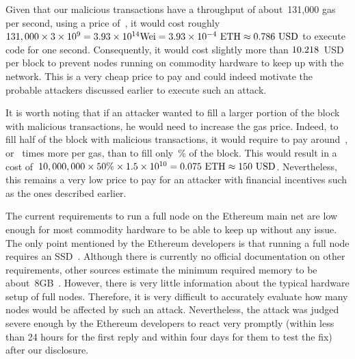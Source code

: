 Given that our malicious transactions have a throughput of about~131,000 gas per second, using a price of~, it would cost roughly~$131,000 \times 3\times 10^9 = 3.93\times 10^{14} \text{Wei} = 3.93\times 10^{-4}~\text{ETH} \approx \fpeval{round(\ToUSD{0.000393}, 4)}~\text{USD}$ to execute code for one second. Consequently, it would cost slightly more than $\fpeval{round(\ToUSD{0.000393 * 13}, 3)}$~USD per block to prevent nodes running on commodity hardware to keep up with the network. This is a very cheap price to pay and could indeed motivate the probable attackers discussed earlier to execute such an attack.

It is worth noting that if an attacker wanted to fill a larger portion of the block with malicious transactions, he would need to increase the gas price. Indeed, to fill half of the block with malicious transactions, it would require to pay around~, or~ times more per gas, than to fill only~\% of the block. This would result in a cost of~$10,000,000 \times 50\% \times 1.5\times 10^{10} = 0.075~\text{ETH} \approx \ToUSD{0.075}~\text{USD}$. Nevertheless, this remains a very low price to pay for an attacker with financial incentives such as the ones described earlier.

The current requirements to run a full node on the Ethereum main net are low enough for most commodity hardware to be able to keep up without any issue. The only point mentioned by the Ethereum developers is that running a full node requires an SSD~\cite{ethereum-faq}. Although there is currently no official documentation on other requirements, other sources estimate the minimum required memory to be about~8GB~\cite{node-incentive,pantheon-system-requirements,eth-hardware-requirements}. However, there is very little information about the typical hardware setup of full nodes. Therefore, it is very difficult to accurately evaluate how many nodes would be affected by such an attack. Nevertheless, the attack was judged severe enough by the Ethereum developers to react very promptly (within less than 24 hours for the first reply and within four days for them to test the fix) after our disclosure.


